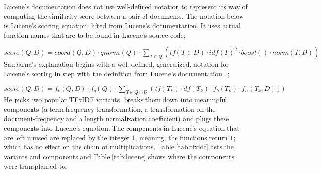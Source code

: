 Lucene's documentation does not use well-defined notation to represent
its way of computing the similarity score between a pair of
documents. The notation below is Lucene's scoring equation, lifted
from Lucene's documentation. It uses actual function names that are to
be found in Lucene's source code;

$score(Q,D) = coord(Q,D) \cdot qnorm(Q) \cdot \displaystyle\sum_{T \in Q} (tf(T \in D) \cdot idf(T)^2 \cdot boost() \cdot norm(T, D))$\\

Sauparna's explanation begins with a well-defined, generalized,
notation for Lucene's scoring in step with the definition from
Lucene's documentation ~\cite{Lucene:6.2.1:Scoring};

$score(Q,D) = f_{c}(Q,D) \cdot f_{q}(Q) \cdot \displaystyle\sum_{T \in Q \cap D}(tf(T_{k}) \cdot df(T_{k}) \cdot f_{b}(T_{k}) \cdot f_{n}(T_{k},D)))$\\

He picks two popular TFxIDF variants, breaks them down into meaningful
components (a term-frequency transformation, a transformation on the
document-frequency and a length normalization coefficient) and plugs
these components into Lucene's equation. The components in Lucene's
equation that are left unused are replaced by the integer $1$,
meaning, the functions return $1$; which has no effect on the chain of
multiplications. Table \ref{tab:tfxidf} lists the variants and
components and Table \ref{tab:lucene} shows where the components were
transplanted to.

